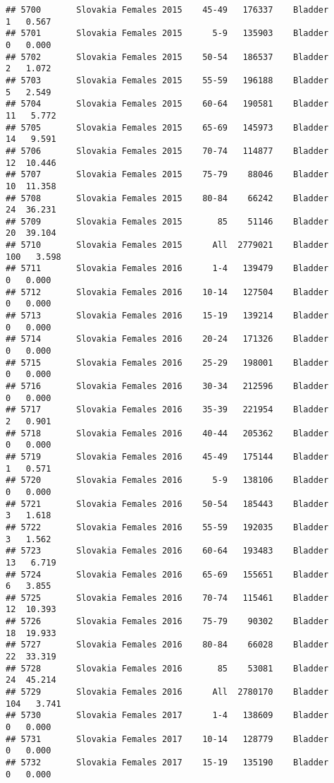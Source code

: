 \documentclass[
]{article}
\begin{document}
\begin{verbatim}
## 5700       Slovakia Females 2015    45-49   176337    Bladder      1   0.567
## 5701       Slovakia Females 2015      5-9   135903    Bladder      0   0.000
## 5702       Slovakia Females 2015    50-54   186537    Bladder      2   1.072
## 5703       Slovakia Females 2015    55-59   196188    Bladder      5   2.549
## 5704       Slovakia Females 2015    60-64   190581    Bladder     11   5.772
## 5705       Slovakia Females 2015    65-69   145973    Bladder     14   9.591
## 5706       Slovakia Females 2015    70-74   114877    Bladder     12  10.446
## 5707       Slovakia Females 2015    75-79    88046    Bladder     10  11.358
## 5708       Slovakia Females 2015    80-84    66242    Bladder     24  36.231
## 5709       Slovakia Females 2015       85    51146    Bladder     20  39.104
## 5710       Slovakia Females 2015      All  2779021    Bladder    100   3.598
## 5711       Slovakia Females 2016      1-4   139479    Bladder      0   0.000
## 5712       Slovakia Females 2016    10-14   127504    Bladder      0   0.000
## 5713       Slovakia Females 2016    15-19   139214    Bladder      0   0.000
## 5714       Slovakia Females 2016    20-24   171326    Bladder      0   0.000
## 5715       Slovakia Females 2016    25-29   198001    Bladder      0   0.000
## 5716       Slovakia Females 2016    30-34   212596    Bladder      0   0.000
## 5717       Slovakia Females 2016    35-39   221954    Bladder      2   0.901
## 5718       Slovakia Females 2016    40-44   205362    Bladder      0   0.000
## 5719       Slovakia Females 2016    45-49   175144    Bladder      1   0.571
## 5720       Slovakia Females 2016      5-9   138106    Bladder      0   0.000
## 5721       Slovakia Females 2016    50-54   185443    Bladder      3   1.618
## 5722       Slovakia Females 2016    55-59   192035    Bladder      3   1.562
## 5723       Slovakia Females 2016    60-64   193483    Bladder     13   6.719
## 5724       Slovakia Females 2016    65-69   155651    Bladder      6   3.855
## 5725       Slovakia Females 2016    70-74   115461    Bladder     12  10.393
## 5726       Slovakia Females 2016    75-79    90302    Bladder     18  19.933
## 5727       Slovakia Females 2016    80-84    66028    Bladder     22  33.319
## 5728       Slovakia Females 2016       85    53081    Bladder     24  45.214
## 5729       Slovakia Females 2016      All  2780170    Bladder    104   3.741
## 5730       Slovakia Females 2017      1-4   138609    Bladder      0   0.000
## 5731       Slovakia Females 2017    10-14   128779    Bladder      0   0.000
## 5732       Slovakia Females 2017    15-19   135190    Bladder      0   0.000

\end{verbatim}
\end{document}
